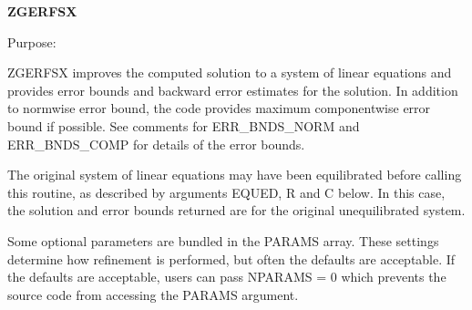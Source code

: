 {\bfseries Z\+G\+E\+R\+F\+S\+X} 

 \begin{DoxyParagraph}{Purpose\+: }
\begin{DoxyVerb}    ZGERFSX improves the computed solution to a system of linear
    equations and provides error bounds and backward error estimates
    for the solution.  In addition to normwise error bound, the code
    provides maximum componentwise error bound if possible.  See
    comments for ERR_BNDS_NORM and ERR_BNDS_COMP for details of the
    error bounds.

    The original system of linear equations may have been equilibrated
    before calling this routine, as described by arguments EQUED, R
    and C below. In this case, the solution and error bounds returned
    are for the original unequilibrated system.\end{DoxyVerb}
 \begin{DoxyVerb}     Some optional parameters are bundled in the PARAMS array.  These
     settings determine how refinement is performed, but often the
     defaults are acceptable.  If the defaults are acceptable, users
     can pass NPARAMS = 0 which prevents the source code from accessing
     the PARAMS argument.\end{DoxyVerb}

\end{DoxyParagraph}

